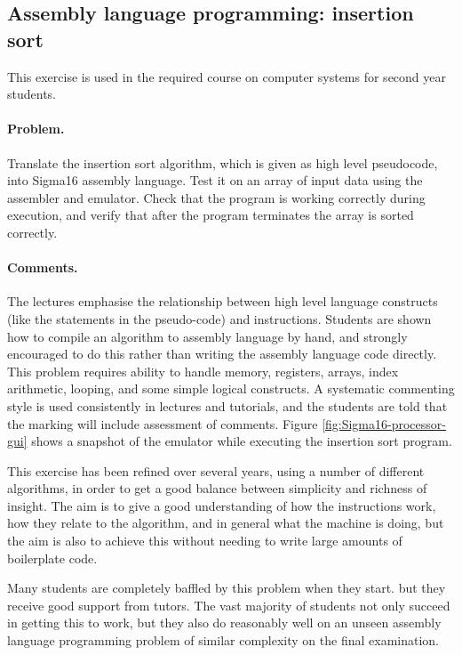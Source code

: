 \documentclass[submission,copyright,creativecommons]{eptcs}
\begin{document}
\subsection{Assembly language programming: insertion sort}

This exercise is used in the required course on computer systems
for second year students.

\paragraph{Problem.} Translate the insertion sort algorithm, which
is given as high level pseudocode, into Sigma16 assembly language.
Test it on an array of input data using the assembler and emulator.
Check that the program is working correctly during execution, and
verify that after the program terminates the array is sorted
correctly.

\paragraph{Comments.}  The lectures emphasise the relationship between
high level language constructs (like the statements in the
pseudo-code) and instructions.  Students are shown how to compile an
algorithm to assembly language by hand, and strongly encouraged to do
this rather than writing the assembly language code directly.  This
problem requires ability to handle memory, registers, arrays, index
arithmetic, looping, and some simple logical constructs.  A systematic
commenting style is used consistently in lectures and tutorials, and
the students are told that the marking will include assessment of
comments.  Figure \ref{fig:Sigma16-processor-gui} shows a snapshot of
the emulator while executing the insertion sort program.

This exercise has been refined over several years, using a number
of different algorithms, in order to get a good balance between
simplicity and richness of insight.  The aim is to give a good
understanding of how the instructions work, how they relate to the
algorithm, and in general what the machine is doing, but the aim is
also to achieve this without needing to write large amounts of
boilerplate code.

Many students are completely baffled by this problem when they
start. but they receive good support from tutors.  The vast
majority of students not only succeed in getting this to work, but
they also do reasonably well on an unseen assembly language
programming problem of similar complexity on the final examination.
\end{document}
